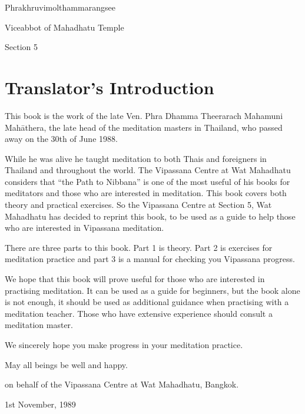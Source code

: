 \documentclass[a5paper,10pt,english]{book}
\begin{document}
\begin{DUlineblock}{0em}
\item[] Phrakhruvimolthammarangsee
\item[] Vice\sphinxhyphen{}abbot of Mahadhatu Temple
\item[] Section 5
\end{DUlineblock}

\clearpage


\section{Translator’s Introduction}
\label{\detokenize{front:translator-s-introduction}}
\sphinxAtStartPar
This book is the work of the late Ven. Phra Dhamma Theerarach Mahamuni Mahāthera, the late head of the meditation masters in Thailand, who passed away on the 30th of June 1988.

\sphinxAtStartPar
While he was alive he taught meditation to both Thais and foreigners in Thailand and throughout the world. The Vipassana Centre at Wat Mahadhatu considers that “the Path to Nibbana” is one of the most useful of his books for meditators and those who are interested in meditation. This book covers both theory and practical exercises. So the Vipassana Centre at Section 5, Wat Mahadhatu has decided to reprint this book, to be used as a guide to help those who are interested in Vipassana meditation.

\sphinxAtStartPar
There are three parts to this book. Part 1 is theory. Part 2 is exercises for meditation practice and part 3 is a manual for checking you Vipassana progress.

\sphinxAtStartPar
We hope that this book will prove useful for those who are interested in practising meditation. It can be used as a guide for beginners, but the book alone is not enough, it should be used as additional guidance when practising with a meditation teacher. Those who have extensive experience should consult a meditation master.

\sphinxAtStartPar
We sincerely hope you make progress in your meditation practice.

\begin{DUlineblock}{0em}
\item[] May all beings be well and happy.
\item[] 
\item[] 
\item[] on behalf of the Vipassana Centre at Wat Mahadhatu, Bangkok.
\item[] 1st November, 1989
\end{DUlineblock}
\end{document}
